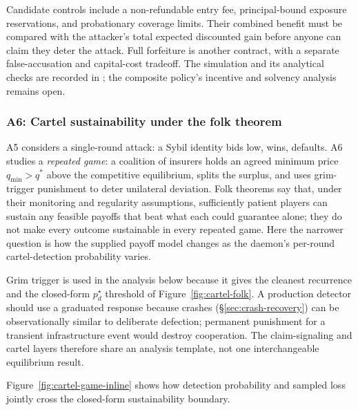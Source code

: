 \documentclass[11pt,a4paper]{article}
\theoremstyle{definition}
\theoremstyle{remark}
\begin{document}


Candidate controls include a non-refundable entry fee, principal-bound
exposure reservations, and probationary coverage limits. Their combined
benefit must be compared with the attacker's total expected discounted gain
before anyone can claim they deter the attack. Full forfeiture is another contract,
with a separate false-accusation and capital-cost tradeoff. The simulation
and its analytical checks are recorded in
; the composite policy's
incentive and solvency analysis remains open.

\subsubsection{A6: Cartel sustainability under the folk theorem}\label{sec:youle:a6}

A5 considers a single-round attack: a Sybil identity bids low, wins, defaults. A6 studies a \emph{repeated game}: a coalition of insurers holds an agreed minimum price $q_{\min} > q^*$ above the competitive equilibrium, splits the surplus, and uses grim-trigger punishment to deter unilateral deviation. Folk theorems say that, under their monitoring and regularity assumptions, sufficiently patient players can sustain any feasible payoffs that beat what each could guarantee alone; they do not make every outcome sustainable in every repeated game. Here the narrower question is how the supplied payoff model changes as the daemon's per-round cartel-detection probability varies.

Grim trigger is used in the analysis below because it gives the cleanest recurrence and the closed-form $p_d^\star$ threshold of Figure~\ref{fig:cartel-folk}. A production detector should use a graduated response because crashes (\S\ref{sec:crash-recovery}) can be observationally similar to deliberate defection; permanent punishment for a transient infrastructure event would destroy cooperation. The claim-signaling and cartel layers therefore share an analysis template, not one interchangeable equilibrium result.

Figure~\ref{fig:cartel-game-inline} shows how detection probability and sampled
loss jointly cross the closed-form sustainability boundary.


\end{document}
